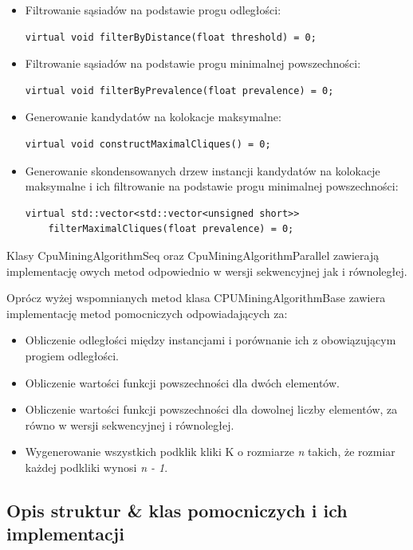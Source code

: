 \documentclass[12pt]{article}
\begin{document}
\begin{itemize}
\item
Filtrowanie sąsiadów na podstawie progu odległości:
\begin{lstlisting}
virtual void filterByDistance(float threshold) = 0;
\end{lstlisting}

\item
Filtrowanie sąsiadów na podstawie progu minimalnej powszechności:
\begin{lstlisting}
virtual void filterByPrevalence(float prevalence) = 0;
\end{lstlisting}

\item
Generowanie kandydatów na kolokacje maksymalne:
\begin{lstlisting}
virtual void constructMaximalCliques() = 0;
\end{lstlisting}

\item
Generowanie skondensowanych drzew instancji kandydatów na kolokacje maksymalne i ich filtrowanie na podstawie progu minimalnej powszechności:
\begin{lstlisting}
virtual std::vector<std::vector<unsigned short>> 
    filterMaximalCliques(float prevalence) = 0;
\end{lstlisting}
\end{itemize}

Klasy CpuMiningAlgorithmSeq oraz CpuMiningAlgorithmParallel zawierają implementację owych metod odpowiednio w wersji sekwencyjnej jak i równoległej.

Oprócz wyżej wspomnianych metod klasa CPUMiningAlgorithmBase zawiera implementację metod pomocniczych odpowiadających za:

\begin{itemize}
\item Obliczenie odległości między instancjami i porównanie ich z obowiązującym progiem odległości.
\item Obliczenie wartości funkcji powszechności dla dwóch elementów.
\item Obliczenie wartości funkcji powszechności dla dowolnej liczby elementów, za równo w wersji sekwencyjnej i równoległej.
\item Wygenerowanie wszystkich podklik kliki K o rozmiarze \textit{n} takich, że rozmiar każdej podkliki wynosi \textit{n - 1}.
\end{itemize}

\subsection{Opis struktur \& klas pomocniczych i ich implementacji}
    
\end{document}
